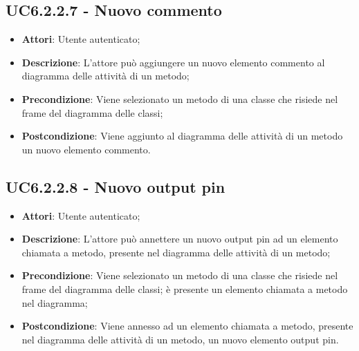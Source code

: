 \subsection{UC6.2.2.7 - Nuovo commento} 
\label{ssec:UC6.2.2.7} 
\begin{itemize} 
\item \textbf{Attori}: Utente autenticato;
\item \textbf{Descrizione}: L'attore può aggiungere un nuovo elemento commento al diagramma delle attività di un metodo;
\item \textbf{Precondizione}: Viene selezionato un metodo di una classe che risiede nel frame del diagramma delle  classi;
\item \textbf{Postcondizione}: Viene aggiunto al diagramma delle attività di un metodo un nuovo elemento commento.
\end{itemize} 
\subsection{UC6.2.2.8 - Nuovo output pin} 
\label{ssec:UC6.2.2.8} 
\begin{itemize} 
\item \textbf{Attori}: Utente autenticato;
\item \textbf{Descrizione}: L'attore può annettere un nuovo output pin ad un elemento chiamata a metodo, presente nel diagramma delle attività di un metodo;
\item \textbf{Precondizione}: Viene selezionato un metodo di una classe che risiede nel frame del diagramma delle  classi; è presente un elemento chiamata a metodo nel diagramma;
\item \textbf{Postcondizione}: Viene annesso ad un elemento chiamata a metodo, presente nel diagramma delle attività di un metodo, un nuovo elemento output pin.
\end{itemize} 
\newpage
